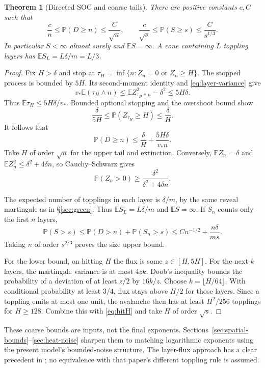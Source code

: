\documentclass[11pt]{article}
\numberwithin{equation}{section}
\newtheorem{theorem}{Theorem}[section]
\theoremstyle{definition}
\newcommand{\E}{\mathbb E}
\newcommand{\Prob}{\mathbb P}
\begin{document}
\begin{theorem}[Directed SOC and coarse tails]\label{thm:directed}
There are positive constants $c,C$ such that
\begin{equation}\label{eq:directed-tails}
 \frac cn\le\Prob(D\ge n)\le\frac C{\sqrt n},\qquad
 \frac c{\sqrt s}\le\Prob(S\ge s)\le\frac C{s^{1/3}}.
\end{equation}
In particular $S<\infty$ almost surely and $\E S=\infty$. A cone containing $L$ toppling layers has $\E S_L=L\delta/m=L/3$.
\end{theorem}
\begin{proof}
Fix $H>\delta$ and stop at $\tau_H=\inf\{n:Z_n=0\text{ or }Z_n\ge H\}$. The stopped process is bounded by $5H$. Its second-moment identity and \eqref{eq:layer-variance} give
\[
 v_*\E(\tau_H\wedge n)
 \le\E Z_{\tau_H\wedge n}^2-\delta^2\le5H\delta.
\]
Thus $\E\tau_H\le5H\delta/v_*$. Bounded optional stopping and the overshoot bound show
\begin{equation}\label{eq:hitH}
 \frac\delta{5H}\le\Prob(Z_{\tau_H}\ge H)\le\frac\delta H.
\end{equation}
It follows that
\[
 \Prob(D\ge n)\le\frac\delta H+\frac{5H\delta}{v_*n}.
\]
Take $H$ of order $\sqrt n$ for the upper tail and extinction. Conversely, $\E Z_n=\delta$ and $\E Z_n^2\le\delta^2+4\delta n$, so Cauchy--Schwarz gives
\[
 \Prob(Z_n>0)\ge\frac{\delta^2}{\delta^2+4\delta n}.
\]

The expected number of topplings in each layer is $\delta/m$, by the same reveal martingale as in \S\ref{sec:green}. Thus $\E S_L=L\delta/m$ and $\E S=\infty$. If $S_n$ counts only the first $n$ layers,
\[
 \Prob(S>s)\le\Prob(D>n)+\Prob(S_n>s)
 \le Cn^{-1/2}+\frac{n\delta}{ms}.
\]
Taking $n$ of order $s^{2/3}$ proves the size upper bound.

For the lower bound, on hitting $H$ the flux is some $z\in[H,5H]$. For the next $k$ layers, the martingale variance is at most $4zk$. Doob's inequality bounds the probability of a deviation of at least $z/2$ by $16k/z$. Choose $k=\lfloor H/64\rfloor$. With conditional probability at least $3/4$, flux stays above $H/2$ for those layers. Since a toppling emits at most one unit, the avalanche then has at least $H^2/256$ topplings for $H\ge128$. Combine this with \eqref{eq:hitH} and take $H$ of order $\sqrt s$.
\end{proof}
These coarse bounds are inputs, not the final exponents. Sections~\ref{sec:spatial-bounds}--\ref{sec:heat-noise} sharpen them to matching logarithmic exponents using the present model's bounded-noise structure. The layer-flux approach has a clear precedent in \cite{KMT}; no equivalence with that paper's different toppling rule is assumed.
\end{document}

